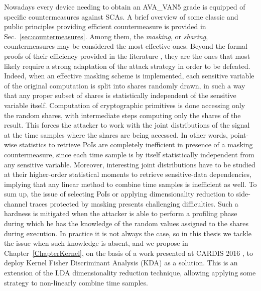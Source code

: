 Nowadays every device needing to obtain an AVA\_VAN5 grade is equipped of specific countermeasures against SCAs. A brief overview of some classic and public principles providing efficient countermeasure is provided in Sec.~\ref{sec:countermeasures}. Among them, the \emph{masking}, or \emph{sharing}, countermeasures may be considered the most effective ones. Beyond the formal proofs of their efficiency provided in the literature \cite{ishai2003private,prouff2013masking,DBLP:conf/eurocrypt/BartheBDFGS15}, they are the ones that most likely require a strong adaptation of the attack strategy in order to be defeated. Indeed, when an effective masking scheme is implemented, each sensitive variable of the original computation is split into shares randomly drawn, in such a way that any proper subset
of shares is statistically independent of the sensitive variable itself. Computation of cryptographic primitives is done
accessing only the random shares, with intermediate steps computing only the shares of the result. This forces the attacker to work with the joint distributions of the signal at the time samples where the shares are being accessed. In other words, point-wise statistics to retrieve PoIs are completely inefficient in presence of a masking countermeasure, since each time sample is by itself statistically independent from any sensitive variable. Moreover, interesting joint distributions have to be studied at their higher-order statistical moments to retrieve sensitive-data dependencies, implying that any linear method to combine time samples is inefficient as well. To sum up, the issue of selecting PoIs or applying dimensionality reduction to side-channel traces protected by masking presents challenging difficulties. Such a hardness is mitigated when the attacker is able to perform a profiling phase during which he has the knowledge of the random values assigned to the shares during execution. In practice it is not always the case, so in this thesis we tackle the issue when such knowledge is absent, and we propose in Chapter~\ref{ChapterKernel}, on the basis of a work presented at CARDIS 2016 \cite{cagli2016kernel}, to deploy Kernel Fisher Discriminant Analysis (KDA) as a solution. This is an extension of the LDA dimensionality reduction technique, allowing applying some strategy to  non-linearly combine time samples. 

